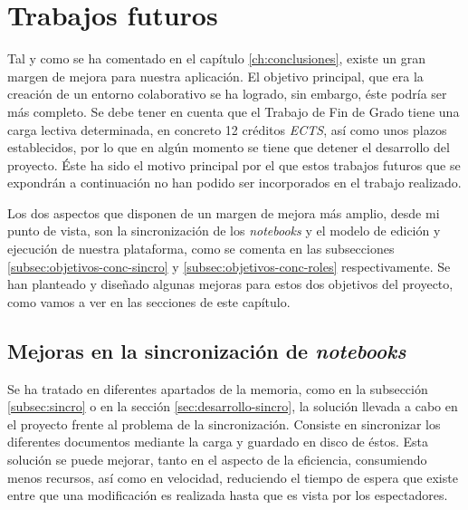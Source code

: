 \documentclass[11pt,spanish,listoffigures]{tfgetsinf}
\begin{document}



\chapter{Trabajos futuros}
\label{ch:futuro}


Tal y como se ha comentado en el capítulo \ref{ch:conclusiones}, existe un gran margen de mejora para nuestra aplicación. El objetivo principal, que era la creación de un entorno colaborativo se ha logrado, sin embargo, éste podría ser más completo. Se debe tener en cuenta que el Trabajo de Fin de Grado tiene una carga lectiva determinada, en concreto 12 créditos \textit{ECTS}, así como unos plazos establecidos, por lo que en algún momento se tiene que detener el desarrollo del proyecto. Éste ha sido el motivo principal por el que estos trabajos futuros que se expondrán a continuación no han podido ser incorporados en el trabajo realizado.

Los dos aspectos que disponen de un margen de mejora más amplio, desde mi punto de vista, son la sincronización de los \textit{notebooks} y el modelo de edición y ejecución de nuestra plataforma, como se comenta en las subsecciones \ref{subsec:objetivos-conc-sincro} y \ref{subsec:objetivos-conc-roles} respectivamente. Se han planteado y diseñado algunas mejoras para estos dos objetivos del proyecto, como vamos a ver en las secciones de este capítulo.



\section{Mejoras en la sincronización de \textit{notebooks}}
\label{sec:mejoras-sincro}

Se ha tratado en diferentes apartados de la memoria, como en la subsección \ref{subsec:sincro} o en la sección \ref{sec:desarrollo-sincro}, la solución llevada a cabo en el proyecto frente al problema de la sincronización. Consiste en sincronizar los diferentes documentos mediante la carga y guardado en disco de éstos. 
Esta solución se puede mejorar, tanto en el aspecto de la eficiencia, consumiendo menos recursos, así como en velocidad, reduciendo el tiempo de espera que existe entre que una modificación es realizada hasta que es vista por los espectadores.
\end{document}
